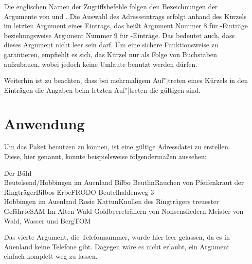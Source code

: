 \begin{Declaration}
\end{Declaration}%
Die englischen Namen der Zugriffsbefehle folgen den Bezeichnungen der
Argumente von  und
.  Die Auswahl des Adresseintrags erfolgt
anhand des Kürzels im letzten Argument eines Eintrags, das heißt Argument
Nummer 8 für -Einträge beziehungsweise
Argument Nummer 9 für -Einträge. Das
bedeutet auch, dass dieses Argument nicht leer sein darf.  Um eine sichere
Funktionsweise zu garantieren, empfiehlt es sich, das Kürzel nur als Folge von
Buchstaben aufzubauen, wobei jedoch keine Umlaute benutzt werden dürfen.

Weiterhin ist zu beachten, dass bei mehrmaligem Auf"|treten
eines Kürzels in den Einträgen die Angaben beim
letzten Auf"|treten die gültigen sind.%
%
\EndIndexGroup


\section{Anwendung}

\BeginIndexGroup
{}%
%
Um das Paket benutzen zu können, ist eine gültige
Adressdatei zu erstellen.
Diese, hier  genannt, könnte beispielsweise
folgendermaßen aussehen:
\begin{lstcode}
            {Der Bühl\\ Beutelsend/Hobbingen im Auenland}{}%
            {Bilbo Beutlin}{Rauchen von Pfeifenkraut}%
            {der Ringträger}{Bilbos Erbe}{FRODO}
           {Beutelhaldenweg 3\\Hobbingen im Auenland}{}%
           {Rosie Kattun}{Knullen}%
           {des Ringträgers treuester Gefährte}{SAM}
           {Im Alten Wald}{}%
           {Goldbeere}{trällern von Nonsensliedern}%
           {Meister von Wald, Wasser und Berg}{TOM}
\end{lstcode}
%
Das vierte Argument, die Telefonnummer, wurde hier leer gelassen, da es in
Auenland keine Telefone gibt. %
\iffalse %
Wie zu sehen ist, sind also auch leere Angaben möglich. Dagegen ist %
\else%
Dagegen wäre %
\fi%
es nicht erlaubt,\nopagebreak{} ein Argument einfach komplett weg zu lassen.

